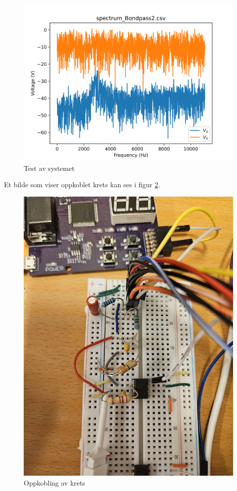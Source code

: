 \begin{figure} [!h]
\centering
\includegraphics[width=0.8\linewidth]{Bilder/spectrum_Bondpass2.png}
\caption{Test av systemet}
\label{fig:systemTest}
\end{figure}

Et bilde som viser oppkoblet krets kan ses i figur \ref{fig:oppkobling}.

\begin{figure} [!h]
\centering
\includegraphics[width=0.6\linewidth]{Bilder/oppkobling.jpg}
\caption{Oppkobling av krets}
\label{fig:oppkobling}
\end{figure}

